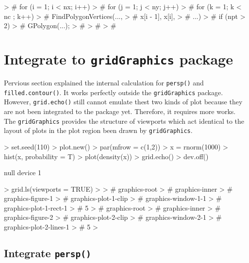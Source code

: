 \documentclass[paper=a4, fontsize=11pt]{report}
\begin{document}
\begin{Schunk}
\begin{Sinput}
> # for (i = 1; i < nx; i++) {
> # for (j = 1; j < ny; j++) {
> #   for (k = 1; k < nc ; k++) {
> # 	FindPolygonVertices(...,
> #                  x[i - 1], x[i],
> # 		                    ...)
> #   if (npt > 2)
> # 	    GPolygon(...);
> #	    }
> # }
> # }
\end{Sinput}
\end{Schunk}


\chapter{Integrate to \texttt{gridGraphics} package}
Pervious section explained the internal calculation for \texttt{persp()} and \texttt{filled.contour()}. It works perfectly outside the \texttt{gridGraphics} package. However, \texttt{grid.echo()} still cannot emulate thest two kinds of plot because they are not been integrated to the package yet. Therefore, it requires more works.\\ 
The \texttt{gridGraphics} provides the structure of viewports which act identical to the layout of plots in the plot region been drawn by \texttt{gridGraphics}.

\begin{Schunk}
\begin{Sinput}
> set.seed(110)
> plot.new()
> par(mfrow = c(1,2))
> x = rnorm(1000)
> hist(x, probability = T)
> plot(density(x))
> grid.echo()
> dev.off()
\end{Sinput}
\begin{Soutput}
null device 
          1 
\end{Soutput}
\end{Schunk}
\begin{Schunk}
\begin{Sinput}
> grid.ls(viewports = TRUE)
> 
> # graphics-root
> #   graphics-inner
> #     graphics-figure-1
> #       graphics-plot-1-clip
> #         graphics-window-1-1
> #           graphics-plot-1-rect-1
> #           5
> # graphics-root
> #   graphics-inner
> #     graphics-figure-2
> #       graphics-plot-2-clip
> #         graphics-window-2-1
> #           graphics-plot-2-lines-1
> #           5
> 
\end{Sinput}
\end{Schunk}


\section{Integrate \texttt{persp()}}
\end{document}
